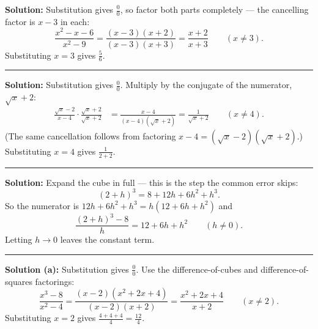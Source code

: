 \documentclass[12pt]{article}
\begin{document}
\textbf{Solution:} Substitution gives $\frac{0}{0}$, so factor both parts
completely --- the cancelling factor is $x - 3$ in each:
\[
  \frac{x^2 - x - 6}{x^2 - 9} = \frac{(x-3)(x+2)}{(x-3)(x+3)} = \frac{x+2}{x+3}
  \qquad (x \neq 3).
\]
Substituting $x = 3$ gives $\frac{5}{6}$. 

\vspace{0.2cm}\noindent\rule{\linewidth}{0.2pt}\vspace{0.2cm}


\textbf{Solution:} Substitution gives $\frac{0}{0}$. Multiply by the conjugate
of the numerator, $\sqrt{x} + 2$:
\begin{align*}
  \frac{\sqrt{x} - 2}{x - 4} \cdot \frac{\sqrt{x} + 2}{\sqrt{x} + 2}
    &= \frac{x - 4}{(x-4)\left(\sqrt{x} + 2\right)}
     = \frac{1}{\sqrt{x} + 2} \qquad (x \neq 4).
\end{align*}
(The same cancellation follows from factoring $x - 4 = (\sqrt{x}-2)(\sqrt{x}+2)$.)
Substituting $x = 4$ gives $\frac{1}{2 + 2}$. 

\vspace{0.2cm}\noindent\rule{\linewidth}{0.2pt}\vspace{0.2cm}


\textbf{Solution:} Expand the cube in full --- this is the step the common
error skips:
\[
  (2+h)^3 = 8 + 12h + 6h^2 + h^3 .
\]
So the numerator is $12h + 6h^2 + h^3 = h\left(12 + 6h + h^2\right)$ and
\[
  \frac{(2+h)^3 - 8}{h} = 12 + 6h + h^2 \qquad (h \neq 0).
\]
Letting $h \to 0$ leaves the constant term. 

\vspace{0.2cm}\noindent\rule{\linewidth}{0.2pt}\vspace{0.2cm}


\textbf{Solution (a):} Substitution gives $\frac{0}{0}$. Use the
difference-of-cubes and difference-of-squares factorings:
\[
  \frac{x^3 - 8}{x^2 - 4}
  = \frac{(x-2)\left(x^2 + 2x + 4\right)}{(x-2)(x+2)}
  = \frac{x^2 + 2x + 4}{x + 2} \qquad (x \neq 2).
\]
Substituting $x = 2$ gives $\frac{4 + 4 + 4}{4} = \frac{12}{4}$. 
\end{document}
